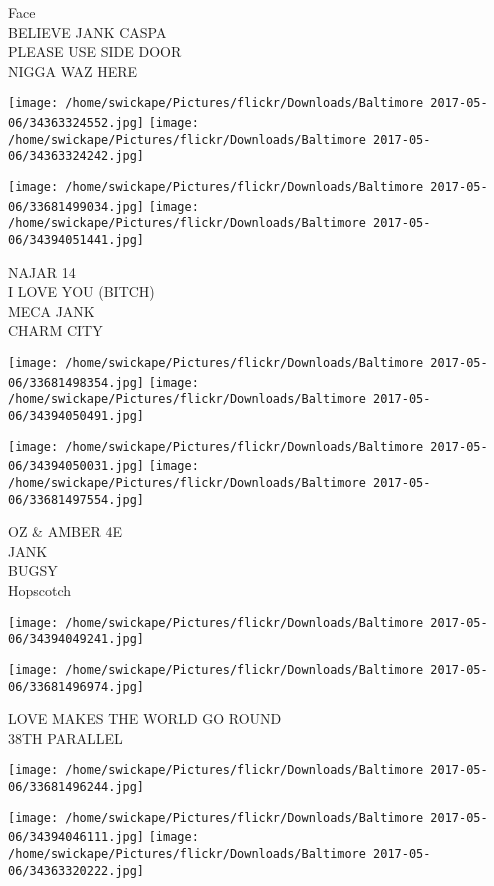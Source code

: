 \documentclass[10pt,letterpaper]{article}
\begin{document}
Face\\
BELIEVE JANK CASPA\\
PLEASE USE SIDE DOOR\\
NIGGA WAZ HERE
\pagebreak

\texttt{[image: /home/swickape/Pictures/flickr/Downloads/Baltimore 2017-05-06/34363324552.jpg]}
\texttt{[image: /home/swickape/Pictures/flickr/Downloads/Baltimore 2017-05-06/34363324242.jpg]}

\texttt{[image: /home/swickape/Pictures/flickr/Downloads/Baltimore 2017-05-06/33681499034.jpg]}
\texttt{[image: /home/swickape/Pictures/flickr/Downloads/Baltimore 2017-05-06/34394051441.jpg]}

NAJAR 14\\
I LOVE YOU (BITCH)\\
MECA JANK\\
CHARM CITY
\pagebreak

\texttt{[image: /home/swickape/Pictures/flickr/Downloads/Baltimore 2017-05-06/33681498354.jpg]}
\texttt{[image: /home/swickape/Pictures/flickr/Downloads/Baltimore 2017-05-06/34394050491.jpg]}

\texttt{[image: /home/swickape/Pictures/flickr/Downloads/Baltimore 2017-05-06/34394050031.jpg]}
\texttt{[image: /home/swickape/Pictures/flickr/Downloads/Baltimore 2017-05-06/33681497554.jpg]}

OZ \& AMBER 4E\\
JANK\\
BUGSY\\
Hopscotch
\pagebreak

\texttt{[image: /home/swickape/Pictures/flickr/Downloads/Baltimore 2017-05-06/34394049241.jpg]}

\vspace{0.25in}
\texttt{[image: /home/swickape/Pictures/flickr/Downloads/Baltimore 2017-05-06/33681496974.jpg]}

LOVE MAKES THE WORLD GO ROUND\\
38TH PARALLEL
\pagebreak

\texttt{[image: /home/swickape/Pictures/flickr/Downloads/Baltimore 2017-05-06/33681496244.jpg]}

\vspace{0.25in}
\texttt{[image: /home/swickape/Pictures/flickr/Downloads/Baltimore 2017-05-06/34394046111.jpg]}
\texttt{[image: /home/swickape/Pictures/flickr/Downloads/Baltimore 2017-05-06/34363320222.jpg]}
\end{document}
